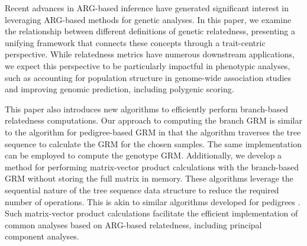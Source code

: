 

Recent advances in ARG-based inference have generated significant interest in leveraging ARG-based methods for genetic analyses. In this paper, we examine the relationship between different definitions of genetic relatedness, presenting a unifying framework that connects these concepts through a trait-centric perspective. While relatedness metrics have numerous downstream applications, we expect this perspective to be particularly impactful in phenotypic analyses, such as accounting for population structure in genome-wide association studies and improving genomic prediction, including polygenic scoring.






This paper also introduces new algorithms to efficiently perform branch-based relatedness computations. Our approach to computing the branch GRM is similar to the algorithm for pedigree-based GRM \citep{emik1949systematic, cruden1949computation, henderson1976simple} in that the algorithm traverses the tree sequence to calculate the GRM for the chosen samples. The same implementation can be employed to compute the genotype GRM. Additionally, we develop a method for performing matrix-vector product calculations with the branch-based GRM without storing the full matrix in memory.  These algorithms leverage the sequential nature of the tree sequence data structure to reduce the required number of operations.  This is akin to similar algorithms developed for pedigrees \citep{colleau2002indirect}. Such matrix-vector product calculations facilitate the efficient implementation of common analyses based on ARG-based relatedness, including principal component analyses.

